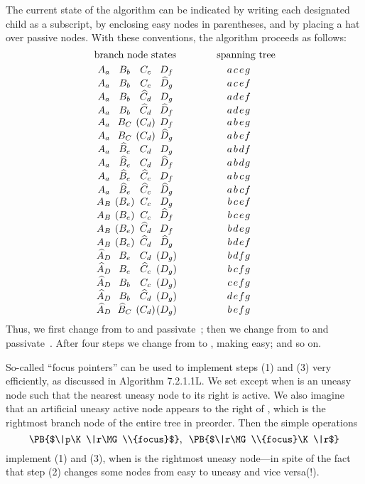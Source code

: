 The current state of the algorithm can be indicated by writing each
designated child as a subscript, by enclosing easy nodes in parentheses,
and by placing a hat over passive nodes. With these conventions,
the algorithm proceeds as follows:
$$\vcenter{\halign{\hbox to2.1em{\hfil$#$\hfil}&
\hbox to2.1em{\hfil$#$\hfil}&
\hbox to2.1em{\hfil$#$\hfil}&
\hbox to2.1em{\hfil$#$\hfil}&
\hskip5em          \hbox to.6em{\hfil$#$\hfil}&
\hbox to.6em{\hfil$#$\hfil}&
\hbox to.6em{\hfil$#$\hfil}&
\hbox to.6em{\hfil$#$\hfil}\cr
\multispan4\hidewidth branch node states\hidewidth&
\multispan4\qquad\qquad spanning tree\cr
\noalign{\smallskip}
A_a&B_b&C_c&D_f&a&c&e&g\cr
A_a&B_b&C_c&\widehat D_g&a&c&e&f\cr
A_a&B_b&\widehat C_d&D_g&a&d&e&f\cr
A_a&B_b&\widehat C_d&\widehat D_f&a&d&e&g\cr
A_a&B_C&(C_d)&D_f&a&b&e&g\cr
A_a&B_C&(C_d)&\widehat D_g&a&b&e&f\cr
A_a&\widehat B_e&C_d&D_g&a&b&d&f\cr
A_a&\widehat B_e&C_d&\widehat D_f&a&b&d&g\cr
A_a&\widehat B_e&\widehat C_c&D_f&a&b&c&g\cr
A_a&\widehat B_e&\widehat C_c&\widehat D_g&a&b&c&f\cr
A_B&(B_e)&C_c&D_g&b&c&e&f\cr
A_B&(B_e)&C_c&\widehat D_f&b&c&e&g\cr
A_B&(B_e)&\widehat C_d&D_f&b&d&e&g\cr
A_B&(B_e)&\widehat C_d&\widehat D_g&b&d&e&f\cr
\widehat A_D&B_e&C_d&(D_g)&b&d&f&g\cr
\widehat A_D&B_e&\widehat C_c&(D_g)&b&c&f&g\cr
\widehat A_D&B_b&C_c&(D_g)&c&e&f&g\cr
\widehat A_D&B_b&\widehat C_d&(D_g)&d&e&f&g\cr
\widehat A_D&\widehat B_C&(C_d)&(D_g)&b&e&f&g\cr
}}$$
Thus, we first change  from  to  and
passivate~; then we
change  from  to  and passivate~.
After four steps we
change  from  to , making  easy;
and so on.

\fi

So-called ``focus pointers'' can be used to implement steps
(1) and (3)
very efficiently, as discussed in Algorithm 7.2.1.1L. We set 
except when  is an uneasy node such that the nearest uneasy node to
its right is active. We also imagine that an artificial uneasy active
node appears to the right of , which is the rightmost
branch node of the entire tree in preorder. Then the simple operations
$$\hbox{\PB{$\|p\K\|r\MG\\{focus}$}, \  \PB{$\|r\MG\\{focus}\K\|r$}}$$
implement (1) and (3), when  is the rightmost uneasy node---in spite
of the fact that step (2) changes some nodes from easy to uneasy
and vice versa(!).

